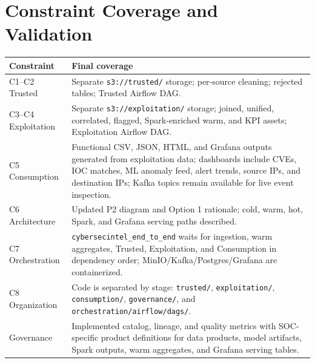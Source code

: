 \documentclass[11pt,a4paper]{article}
\newcommand{\code}[1]{\nolinkurl{#1}}
\newcommand{\hdr}{\rowcolor{csiHead}}
\begin{document}
\section{Constraint Coverage and Validation}

\begin{tabularx}{\textwidth}{>{\raggedright\arraybackslash}p{2.4cm}X}
\toprule
\hdr
\textbf{Constraint} & \textbf{Final coverage}\\
\midrule
C1--C2 Trusted & Separate \code{s3://trusted/} storage; per-source cleaning; rejected tables; Trusted Airflow DAG.\\
C3--C4 Exploitation & Separate \code{s3://exploitation/} storage; joined, unified, correlated, flagged, Spark-enriched warm, and KPI assets; Exploitation Airflow DAG.\\
C5 Consumption & Functional CSV, JSON, HTML, and Grafana outputs generated from exploitation data; dashboards include CVEs, IOC matches, ML anomaly feed, alert trends, source IPs, and destination IPs; Kafka topics remain available for live event inspection.\\
C6 Architecture & Updated P2 diagram and Option 1 rationale; cold, warm, hot, Spark, and Grafana serving paths described.\\
C7 Orchestration & \code{cybersecintel_end_to_end} waits for ingestion, warm aggregates, Trusted, Exploitation, and Consumption in dependency order; MinIO/Kafka/Postgres/Grafana are containerized.\\
C8 Organization & Code is separated by stage: \code{trusted/}, \code{exploitation/}, \code{consumption/}, \code{governance/}, and \code{orchestration/airflow/dags/}.\\
Governance & Implemented catalog, lineage, and quality metrics with SOC-specific product definitions for data products, model artifacts, Spark outputs, warm aggregates, and Grafana serving tables.\\
\bottomrule
\end{tabularx}
\end{document}
